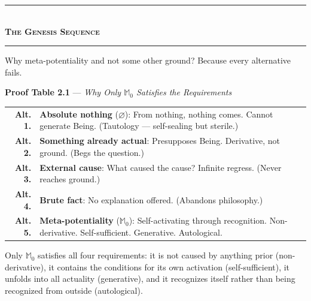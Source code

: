 \documentclass[10pt, openany, oneside]{book}
\renewcommand{\normalsize}{\fontsize{10}{13}\selectfont}
\begin{document}
\vspace{1.5em}


\begin{center}
    \rule{0.3\textwidth}{0.4pt}\\[0.5em]
    {\normalsize\bfseries\scshape The Genesis Sequence}\\[0.3em]
    \rule{0.3\textwidth}{0.4pt}
\end{center}

\vspace{1em}

\noindent Why meta-potentiality and not some other ground? Because every alternative fails.

\vspace{0.5em}

\textbf{Proof Table 2.1} --- \textit{Why Only $\mathbb{M}_0$ Satisfies the Requirements}

\vspace{0.5em}

\noindent\begin{tabular}{r p{}}
\textbf{Alt. 1.} & \textbf{Absolute nothing} ($\varnothing$): From nothing, nothing comes. Cannot generate Being. (Tautology --- self-sealing but sterile.) \\[0.3em]
\textbf{Alt. 2.} & \textbf{Something already actual}: Presupposes Being. Derivative, not ground. (Begs the question.) \\[0.3em]
\textbf{Alt. 3.} & \textbf{External cause}: What caused the cause? Infinite regress. (Never reaches ground.) \\[0.3em]
\textbf{Alt. 4.} & \textbf{Brute fact}: No explanation offered. (Abandons philosophy.) \\[0.3em]
\textbf{Alt. 5.} & \textbf{Meta-potentiality} ($\mathbb{M}_0$): Self-activating through recognition. Non-derivative. Self-sufficient. Generative. Autological. \\[0.3em]
\end{tabular}

\vspace{0.8em}

\noindent Only $\mathbb{M}_0$ satisfies all four requirements: it is not caused by anything prior (non-derivative), it contains the conditions for its own activation (self-sufficient), it unfolds into all actuality (generative), and it recognizes itself rather than being recognized from outside (autological).
\end{document}
